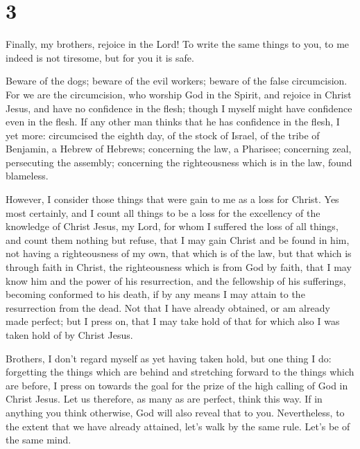 \hypertarget{section-2}{%
\section{3}\label{section-2}}

 Finally, my brothers, rejoice in the Lord! To write the
same things to you, to me indeed is not tiresome, but for you it is
safe.

 Beware of the dogs; beware of the evil workers; beware of
the false circumcision.  For we are the circumcision, who
worship God in the Spirit, and rejoice in Christ Jesus, and have no
confidence in the flesh;  though I myself might have
confidence even in the flesh. If any other man thinks that he has
confidence in the flesh, I yet more:  circumcised the
eighth day, of the stock of Israel, of the tribe of Benjamin, a Hebrew
of Hebrews; concerning the law, a Pharisee;  concerning
zeal, persecuting the assembly; concerning the righteousness which is in
the law, found blameless.

 However, I consider those things that were gain to me as
a loss for Christ.  Yes most certainly, and I count all
things to be a loss for the excellency of the knowledge of Christ Jesus,
my Lord, for whom I suffered the loss of all things, and count them
nothing but refuse, that I may gain Christ  and be found
in him, not having a righteousness of my own, that which is of the law,
but that which is through faith in Christ, the righteousness which is
from God by faith,  that I may know him and the power of
his resurrection, and the fellowship of his sufferings, becoming
conformed to his death,  if by any means I may attain to
the resurrection from the dead.  Not that I have already
obtained, or am already made perfect; but I press on, that I may take
hold of that for which also I was taken hold of by Christ Jesus.

 Brothers, I don't regard myself as yet having taken
hold, but one thing I do: forgetting the things which are behind and
stretching forward to the things which are before,  I
press on towards the goal for the prize of the high calling of God in
Christ Jesus.  Let us therefore, as many as are perfect,
think this way. If in anything you think otherwise, God will also reveal
that to you.  Nevertheless, to the extent that we have
already attained, let's walk by the same rule. Let's be of the same
mind.


